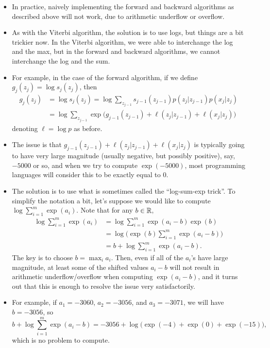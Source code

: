 \documentclass[12pt]{article}
\begin{document}
\begin{itemize}
\item In practice, naively implementing the forward and backward algorithms as described above will not work, due to arithmetic underflow or overflow.
\item As with the Viterbi algorithm, the solution is to use logs, but things are a bit trickier now.  In the Viterbi algorithm, we were able to interchange the log and the max, but in the forward and backward algorithms, we cannot interchange the log and the sum.
\item For example, in the case of the forward algorithm, if we define $g_j(z_j) = \log s_j(z_j)$, then
\begin{align*}
g_j(z_j) & = \log s_j(z_j) = \log \sum_{z_{j -1}} s_{j -1}(z_{j -1}) p(z_j | z_{j -1}) p(x_j | z_j)\\
& = \log \sum_{z_{j -1}} \exp \big(g_{j -1}(z_{j -1}) + \ell(z_j | z_{j -1}) + \ell(x_j | z_j) \big)
\end{align*}
denoting $\ell = \log p$ as before.
\item The issue is that $g_{j -1}(z_{j -1}) + \ell(z_j | z_{j -1}) + \ell(x_j | z_j)$ is typically going to have very large magnitude (usually negative, but possibly positive), say, $-5000$ or so, and when we try to compute $\exp(-5000)$, most programming languages will consider this to be exactly equal to $0$. 
\item The solution is to use what is sometimes called the ``log-sum-exp trick''.  To simplify the notation a bit, let's suppose we would like to compute $\log \sum_{i = 1}^m \exp(a_i)$.  Note that for any $b \in \mathbb{R}$,
\begin{align*}
\log \sum_{i = 1}^m \exp(a_i) 
&= \log \sum_{i = 1}^m \exp(a_i-b)\exp(b)\\
&= \log \Big(\exp(b)\sum_{i = 1}^m \exp(a_i-b)\Big)\\
&= b + \log \sum_{i = 1}^m \exp(a_i-b).
\end{align*}
The key is to choose $b = \max_i a_i$.  Then, even if all of the $a_i$'s have large magnitude, at least some of the shifted values $a_i - b$ will not result in arithmetic underflow/overflow when computing $\exp(a_i - b)$, and it turns out that this is enough to resolve the issue very satisfactorily.
\item For example, if $a_1 = -3060$, $a_2 = -3056$, and $a_3 = -3071$, we will have $b = -3056$, so 
$$ b + \log \sum_{i = 1}^m \exp(a_i-b) = -3056 + \log \big(\exp(-4) + \exp(0) + \exp(-15)),$$
which is no problem to compute.

\end{itemize}
\end{document}
